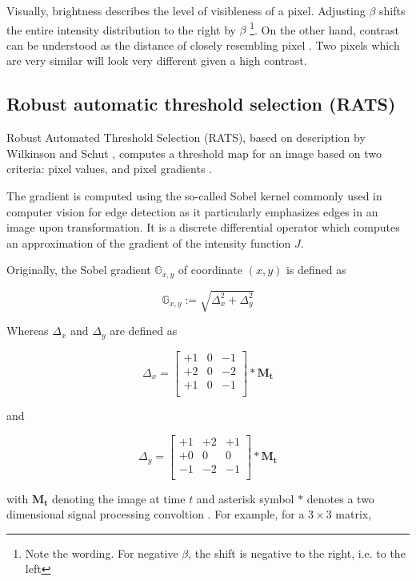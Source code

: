 \documentclass[pdftex,12pt,a4paper]{report}
\begin{document}
Visually, brightness describes the level of visibleness of a pixel. Adjusting $\beta$ shifts the entire intensity distribution to the right by $\beta$ \footnote{Note the wording. For negative $\beta$, the shift is negative to the right, i.e. to the left}. On the other hand, contrast can be understood as the distance of closely resembling pixel \cite{hartley2003multiple}. Two pixels which are very similar will look very different given a high contrast.

\subsection{Robust automatic threshold selection (RATS)}
\label{subsubsection:rats}

Robust Automated Threshold Selection (RATS), based on description by Wilkinson and Schut \cite{wilkinson1998digital}, computes a threshold map for an image based on two criteria: pixel values, and pixel gradients \cite{fiji2017rats}.

The gradient is computed using the so-called Sobel kernel \cite{sobel1990isotropic} commonly used in computer vision for edge detection as it particularly emphasizes edges in an image upon transformation. It is a discrete differential operator which computes an approximation of the gradient of the intensity function $J$.

Originally, the Sobel gradient $\mathbb{G}_{x, y}$ of coordinate $(x, y)$ is defined as

$$
\mathbb{G}_{x, y} := \sqrt{\Delta_x^2 + \Delta_y^2}
$$

Whereas $\Delta_x$ and $\Delta_y$ are defined as

\[
\Delta_x = 
\begin{bmatrix}
+1 & 0 & -1 \\
+2 & 0 & -2 \\
+1 & 0 & -1 \\
\end{bmatrix}
*
\mathbf{M_t}
\]

and

\[
\Delta_y = 
\begin{bmatrix}
+1 & +2 & +1 \\
+0 & 0 & 0 \\
-1 & -2 & -1 \\
\end{bmatrix}
*
\mathbf{M_t}
\]

with $\mathbf{M_t}$ denoting the image at time $t$ and asterisk symbol $*$ denotes  a two dimensional signal processing convoltion \cite{smith1997scientist}. For example, for a $3 \times 3$ matrix,
\end{document}
